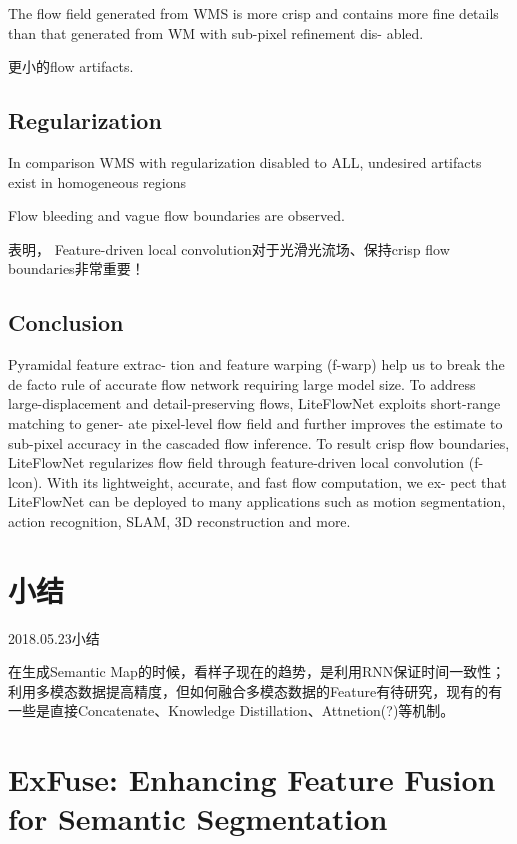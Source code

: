 The flow field generated from
WMS is more crisp and contains more fine details than
that generated from WM with sub-pixel refinement dis-
abled.

更小的flow artifacts.

\subsection{Regularization}

In comparison WMS with regularization
disabled to ALL, undesired artifacts exist in homogeneous
regions

Flow bleeding and
vague flow boundaries are observed.

表明， Feature-driven local convolution对于光滑光流场、保持crisp flow boundaries非常重要！

\subsection{Conclusion}

Pyramidal feature extrac-
tion and feature warping (f-warp) help us to break the de
facto rule of accurate flow network requiring large model
size. To address large-displacement and detail-preserving
flows, LiteFlowNet exploits short-range matching to gener-
ate pixel-level flow field and further improves the estimate
to sub-pixel accuracy in the cascaded flow inference. To
result crisp flow boundaries, LiteFlowNet regularizes flow
field through feature-driven local convolution (f-lcon). With
its lightweight, accurate, and fast flow computation, we ex-
pect that LiteFlowNet can be deployed to many applications
such as motion segmentation, action recognition, SLAM,
3D reconstruction and more.


\section{小结}

2018.05.23小结

在生成Semantic Map的时候，看样子现在的趋势，是利用RNN保证时间一致性；利用多模态数据提高精度，但如何融合多模态数据的Feature有待研究，现有的有一些是直接Concatenate、Knowledge Distillation、Attnetion(?)等机制。


\section{ExFuse: Enhancing Feature Fusion for Semantic Segmentation}

